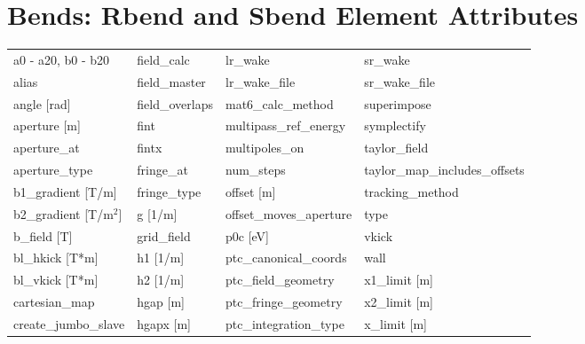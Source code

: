  \section{Bends: Rbend and Sbend Element Attributes}
 \label{s:list.bend}
 
 \begin{tabular}{llll} \toprule
a0 - a20, b0 - b20               & field_calc                       & lr_wake                          & sr_wake                          \\
alias                            & field_master                     & lr_wake_file                     & sr_wake_file                     \\
angle [rad]                      & field_overlaps                   & mat6_calc_method                 & superimpose                      \\
aperture [m]                     & fint                             & multipass_ref_energy             & symplectify                      \\
aperture_at                      & fintx                            & multipoles_on                    & taylor_field                     \\
aperture_type                    & fringe_at                        & num_steps                        & taylor_map_includes_offsets      \\
b1_gradient [T/m]                & fringe_type                      & offset [m]                       & tracking_method                  \\
b2_gradient [T/m$^2$]            & g [1/m]                          & offset_moves_aperture            & type                             \\
b_field [T]                      & grid_field                       & p0c [eV]                         & vkick                            \\
bl_hkick [T*m]                   & h1 [1/m]                         & ptc_canonical_coords             & wall                             \\
bl_vkick [T*m]                   & h2 [1/m]                         & ptc_field_geometry               & x1_limit [m]                     \\
cartesian_map                    & hgap [m]                         & ptc_fringe_geometry              & x2_limit [m]                     \\
create_jumbo_slave               & hgapx [m]                        & ptc_integration_type             & x_limit [m]                      \\

\end{tabular}
